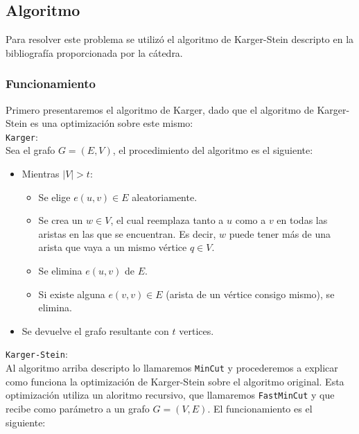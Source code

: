 \documentclass[a4paper, 10pt]{article}
\def\code#1{\texttt{#1}}
\begin{document}
        \subsection{Algoritmo}
                Para resolver este problema se utilizó el algoritmo de Karger-Stein descripto en
            la bibliografía proporcionada por la cátedra.
            \subsubsection{Funcionamiento}
                    Primero presentaremos el algoritmo de Karger, dado que el algoritmo de Karger-Stein
                es una optimización sobre este mismo: \\
                \code{Karger}:\\
                    Sea el grafo $G = (E, V)$, el procedimiento del algoritmo es el siguiente:
                    \begin{itemize}
                        \item Mientras $|V| > t$:
                        \begin{itemize}
                            \item Se elige $e(u, v) \in E$ aleatoriamente.
                            \item Se crea un $w \in V$, el cual reemplaza tanto a $u$ como a $v$ en todas
                            las aristas en las que se encuentran. Es decir, $w$ puede tener más de una arista
                            que vaya a un mismo vértice $q \in V$.
                            \item Se elimina $e(u, v)$ de $E$.
                            \item Si existe alguna $e(v, v) \in E$ (arista de un vértice consigo mismo), se elimina.
                        \end{itemize}
                        \item Se devuelve el grafo resultante con $t$ vertices.
                    \end{itemize}
                \code{Karger-Stein}:\\
                        Al algoritmo arriba descripto lo llamaremos \code{MinCut} y procederemos a explicar
                    como funciona la optimización de Karger-Stein sobre el algoritmo original.
                        Esta optimización utiliza un aloritmo recursivo, que llamaremos \code{FastMinCut} y que
                    recibe como parámetro a un grafo $G = (V, E)$. El funcionamiento es el siguiente:
\end{document}
